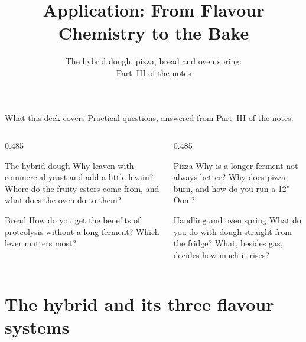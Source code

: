 \documentclass[aspectratio=169,11pt]{beamer}
\title[Application]{Application: From Flavour Chemistry to the Bake}
\subtitle{The hybrid dough, pizza, bread and oven spring:\\
  Part~III of the notes}
\begin{document}
\begin{frame}[plain]\titlepage\end{frame}

\begin{frame}{What this deck covers}
  Practical questions, answered from Part~III of the notes:
  \medskip
  \begin{columns}[T,onlytextwidth]
    \begin{column}{0.485\textwidth}
      \begin{block}{The hybrid dough}\small
        Why leaven with commercial yeast and add a little levain?
        Where do the fruity esters come from, and what does the oven do
        to them?
      \end{block}
      \begin{block}{Bread}\small
        How do you get the benefits of proteolysis without a long
        ferment? Which lever matters most?
      \end{block}
    \end{column}
    \begin{column}{0.485\textwidth}
      \begin{block}{Pizza}\small
        Why is a longer ferment not always better? Why does pizza burn,
        and how do you run a 12" Ooni?
      \end{block}
      \begin{block}{Handling and oven spring}\small
        What do you do with dough straight from the fridge? What,
        besides gas, decides how much it rises?
      \end{block}
    \end{column}
  \end{columns}
\end{frame}

\section{The hybrid and its three flavour systems}
\end{document}
